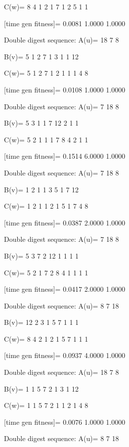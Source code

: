 C(w)=
     8     4     1     2     1     7     1     2     5     1     1

[time gen fitness]=
    0.0081    1.0000    1.0000

Double digest sequence:
A(u)=
    18     7     8

B(v)=
     5     1     2     7     1     3     1     1    12

C(w)=
     5     1     2     7     1     2     1     1     1     4     8

[time gen fitness]=
    0.0108    1.0000    1.0000

Double digest sequence:
A(u)=
     7    18     8

B(v)=
     5     3     1     1     7    12     2     1     1

C(w)=
     5     2     1     1     1     7     8     4     2     1     1

[time gen fitness]=
    0.1514    6.0000    1.0000

Double digest sequence:
A(u)=
     7    18     8

B(v)=
     1     2     1     1     3     5     1     7    12

C(w)=
     1     2     1     1     2     1     5     1     7     4     8

[time gen fitness]=
    0.0387    2.0000    1.0000

Double digest sequence:
A(u)=
     7    18     8

B(v)=
     5     3     7     2    12     1     1     1     1

C(w)=
     5     2     1     7     2     8     4     1     1     1     1

[time gen fitness]=
    0.0417    2.0000    1.0000

Double digest sequence:
A(u)=
     8     7    18

B(v)=
    12     2     3     1     5     7     1     1     1

C(w)=
     8     4     2     1     2     1     5     7     1     1     1

[time gen fitness]=
    0.0937    4.0000    1.0000

Double digest sequence:
A(u)=
    18     7     8

B(v)=
     1     1     5     7     2     1     3     1    12

C(w)=
     1     1     5     7     2     1     1     2     1     4     8

[time gen fitness]=
    0.0076    1.0000    1.0000

Double digest sequence:
A(u)=
     8     7    18

